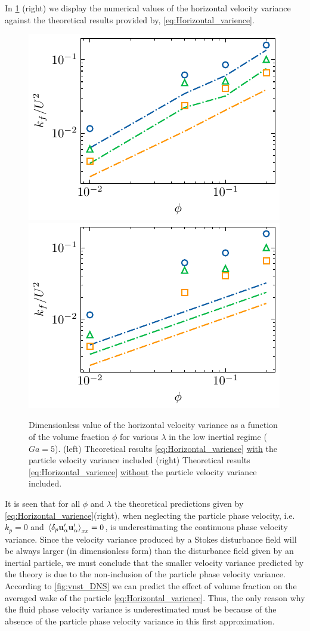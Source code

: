 In \ref{fig:uuxx} (right) we display the numerical values of the horizontal velocity variance against the theoretical results provided by, \ref{eq:Horizontal_varience}. 
\begin{figure}
    \centering
    \includegraphics[height = 0.25\textwidth]{image/HOMOGENEOUS_final/CA/UUxx2_Ga_5.pdf}
    \includegraphics[height = 0.25\textwidth]{image/HOMOGENEOUS_final/CA/UUxx_Ga_5.pdf}
    \caption{Dimensionless value of the horizontal velocity variance  as a function of the volume fraction $\phi$ for various $\lambda$ in the low inertial regime ($Ga = 5$). 
    (left) Theoretical results \eqref{eq:Horizontal_varience} \underline{with} the particle velocity variance included
    (right) Theoretical results  \eqref{eq:Horizontal_varience} \underline{without} the particle velocity variance included. 
    }
    \label{fig:uuxx}
\end{figure}
It is seen that for all $\phi$ and $\lambda$ the theoretical predictions given by \ref{eq:Horizontal_varience}(right), when neglecting the particle phase velocity, i.e.  $k_p =0$ and $ \left<\delta_p \textbf{u}_\alpha'\textbf{u}_\alpha'\right>_{xx} = 0 $, is underestimating the continuous phase velocity variance. 
Since the velocity variance produced by a Stokes disturbance field will be always larger (in dimensionless form) than the disturbance field given by an inertial particle, we must conclude that the smaller velocity variance predicted by the theory is due to the non-inclusion of the particle phase velocity variance. 
According to \ref{fig:vnst_DNS} we can predict the effect of volume fraction on the averaged wake of the particle \eqref{eq:Horizontal_varience}.
Thus, the only reason why the fluid phase velocity variance is underestimated must be because of the absence of the particle phase velocity variance in this first approximation.  


